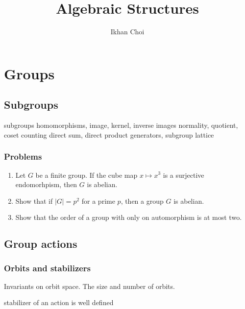 \documentclass{../note}
\begin{document}
\title{Algebraic Structures}
\author{Ikhan Choi}
\maketitle
\tableofcontents

\part{Groups}
\chapter{Subgroups}
subgroups
homomorphisms, image, kernel, inverse images
normality, quotient, coset counting
direct sum, direct product
generators, subgroup lattice




\section*{Problems}
\begin{enumerate}
\item Let $G$ be a finite group. If the cube map $x\mapsto x^3$ is a surjective endomorhpism, then $G$ is abelian.
\item Show that if $|G|=p^2$ for a prime $p$, then a group $G$ is abelian.
\item Show that the order of a group with only on automorphism is at most two.
\end{enumerate}









\chapter{Group actions}
\section{Orbits and stabilizers}
Invariants on orbit space.
The size and number of orbits.

\begin{prb}
stabilizer of an action is well defined

\end{prb}
\end{document}
